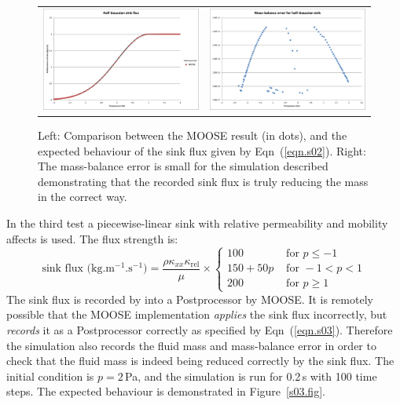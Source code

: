 \documentclass[]{scrreprt}
\begin{document}
\begin{figure}[htb]
\centering
\begin{tabular}{cc}
\includegraphics[width=7cm]{s02.eps} &
\includegraphics[width=7cm]{s02_mass_bal.eps}
\end{tabular}
\caption{Left: Comparison between the MOOSE result (in dots), and the
  expected behaviour of the sink flux given by Eqn~(\ref{eqn.s02}).
  Right: The mass-balance error is small for the simulation described
  demonstrating that the recorded sink flux is truly reducing the mass
  in the correct way.}
\label{s02.fig}
\end{figure}


\noindent In the third test a piecewise-linear sink with relative
permeability and mobility affects is used.  The flux strength is:
\begin{equation}
\mbox{sink flux (kg.m$^{-1}$.s$^{-1}$)} = 
\frac{\rho\kappa_{xx}\kappa_{\mathrm{rel}}}{\mu}
\times \left\{
\begin{array}{ll}
100 & \mbox{ for } p \leq -1 \\
150+50p& \mbox{ for } -1<p<1 \\
200 & \mbox{ for } p\geq 1 
\end{array}
\right.
\label{eqn.s03}
\end{equation}
The sink flux is recorded by into a Postprocessor by MOOSE.  It is
remotely possible that the MOOSE implementation {\em applies} the sink
flux incorrectly, but {\em records} it as a Postprocessor correctly as
specified by Eqn~(\ref{eqn.s03}).  Therefore the simulation also
records the fluid mass and mass-balance error in order to check that
the fluid mass is indeed being reduced correctly by the sink flux.
The initial condition is $p=2$\,Pa, and the simulation is run for
0.2\,s with 100 time steps.  The expected behaviour is demonstrated in
Figure~\ref{s03.fig}.
\end{document}
